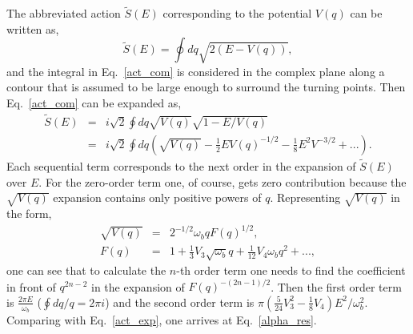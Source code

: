 \documentclass[journal=jpcafh,manuscript=article]{achemso}
\begin{document}
The abbreviated action $\tilde{S}(E)$ corresponding to the potential
$V(q)$ can be written as,
\begin{equation}
  \label{act_com}
  \tilde{S}(E)=\oint dq\sqrt{2(E-V(q))},
\end{equation}
and the integral in Eq.~\ref{act_com} is considered in the complex
plane along a contour that is assumed to be large enough to
surround the turning points. Then Eq.~\ref{act_com} can be expanded
as,
\begin{eqnarray}
  \label{act_com1}
  \tilde{S}(E)&=&i\sqrt{2}\oint dq\sqrt{V(q)}\sqrt{1-E/V(q)}
  \\
  \nonumber
              &=&i\sqrt{2}\oint dq
  (\sqrt{V(q)}-\frac{1}{2}EV(q)^{-1/2}-\frac{1}{8}E^2V^{-3/2}+...).
\end{eqnarray}
Each sequential term corresponds to the next order in the expansion of $\tilde{S}(E)$
over $E$.  For the zero-order term one, of course, gets zero
contribution because the $\sqrt{V(q)}$ expansion contains only positive
powers of $q$.  Representing $\sqrt{V(q)}$ in the form,
\begin{eqnarray}
  \label{act_com2}
  \sqrt{V(q)}&=&2^{-1/2}\omega_bqF(q)^{1/2},
  \\
  \nonumber
  F(q)&=&1+\frac{1}{3}V_3\sqrt{\omega_b}q+\frac{1}{12}V_4\omega_bq^2+...,
\end{eqnarray}
one can see that to calculate the $n$-th order term one needs to find the
coefficient in front of $q^{2n-2}$ in the expansion of
$F(q)^{-(2n-1)/2}$.  Then the first order term is
$\frac{2\pi E}{\omega_b}$ ($\oint dq/q=2\pi i$) and the second order term
is $\pi(\frac{5}{24}V_3^2-\frac{1}{8}V_4)E^2/\omega_b^2$. Comparing with
Eq.~\ref{act_exp}, one arrives at Eq.~\ref{alpha_res}.
\end{document}
